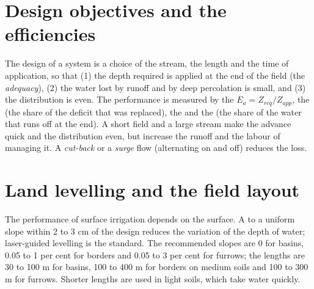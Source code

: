 \section{Design objectives and the efficiencies}
The design of a system is a choice of the stream, the length and the time of application, so that (1) the depth required is applied at the end of the field (the \emph{adequacy}), (2) the water lost by runoff and by deep percolation is small, and (3) the distribution is even. The performance is measured by the  $E_a=Z_{req}/Z_{app}$, the  (the share of the deficit that was replaced), the  and the  (the share of the water that runs off at the end). A short field and a large stream make the advance quick and the distribution even, but increase the runoff and the labour of managing it. A \emph{cut-back} or a \emph{surge} flow (alternating on and off) reduces the loss.

\section{Land levelling and the field layout}
The performance of surface irrigation depends on the surface. A  to a uniform slope within 2 to 3 cm of the design reduces the variation of the depth of water; laser-guided levelling is the standard. The recommended slopes are 0 for basins, 0.05 to 1 per cent for borders and 0.05 to 3 per cent for furrows; the lengths are 30 to 100 m for basins, 100 to 400 m for borders on medium soils and 100 to 300 m for furrows. Shorter lengths are used in light soils, which take water quickly.
